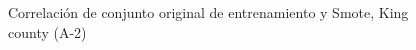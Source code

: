 \begin{figure}[H]
    \centering
    
    \caption{Correlación de conjunto original de entrenamiento y Smote, King county (A-2)}
    \label{pairwise-king county-a-2-smote-enc}
\end{figure}